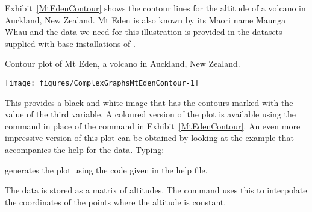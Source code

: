 Exhibit~\ref{MtEdenContour} shows the contour lines for the altitude of a volcano in Auckland, New Zealand. Mt Eden is also known by its Maori name Maunga Whau and the data we need for this illustration is provided in the datasets supplied with base installations of \R{}. 
\begin{exhibit} 
\begin{center} 
\caption{Contour plot of Mt Eden, a volcano in Auckland, New Zealand.} 
\label{MtEdenContour} 
\begin{knitrout}
\color{fgcolor}\begin{kframe}
\begin{alltt}
\hlstd{> }
\end{alltt}
\end{kframe}
\texttt{[image: figures/ComplexGraphsMtEdenContour-1]} 

\end{knitrout}
\end{center} 
\end{exhibit} 
 
This provides a black and white image that has the contours marked with the value of the third variable. A coloured version of the plot is available using the  command in place of the  command in Exhibit~\ref{MtEdenContour}. An even more impressive version of this plot can be obtained by looking at the example that accompanies the help for the  data. Typing: 
\begin{knitrout}
\color{fgcolor}\begin{kframe}
\begin{alltt}
\hlstd{> }
\end{alltt}
\end{kframe}
\end{knitrout}
generates the plot using the code given in the help file. 
 
The  data is stored as a matrix of altitudes. The  command uses this to interpolate the coordinates of the points where the altitude is constant. 
 

